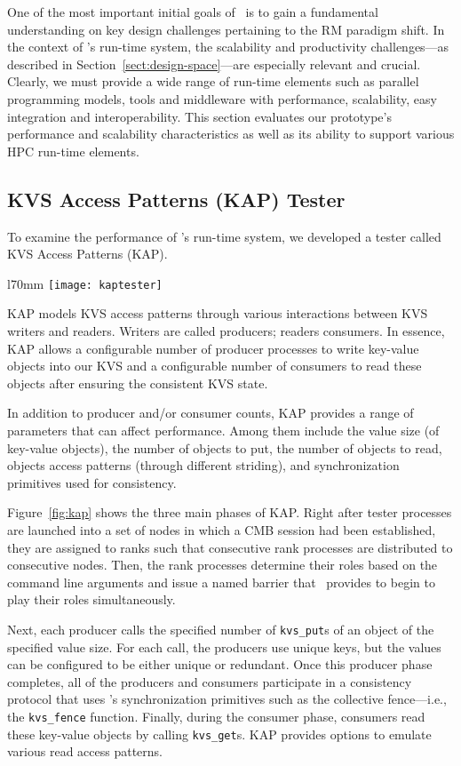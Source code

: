 One of the most important initial goals of \flux\ is to gain
a fundamental understanding on key design challenges pertaining
to the RM paradigm shift.
In the context of \flux's run-time system, the scalability
and productivity challenges---as described
in Section~\ref{sect:design-space}---are especially
relevant and crucial. Clearly, we  must provide a wide range
of run-time elements such as parallel programming models,
tools and middleware with performance, scalability, easy integration
and interoperability.
This section evaluates our prototype's performance
and scalability characteristics as well as its ability
to support various HPC run-time elements.


\subsection{KVS Access Patterns (KAP) Tester}
To examine the performance of \flux's run-time system,
we developed a tester called KVS Access Patterns (KAP).
\begin{wrapfigure}{l}{70mm}
  \vspace{-.5cm}
  \centering
  \texttt{[image: kaptester]}
  \caption{Main phases of KAP tester}
  \vspace{-.5cm}
  \label{fig:kap}
\end{wrapfigure}
KAP models KVS access patterns through various interactions
between KVS writers and readers. Writers are called producers;
readers consumers.
In essence, KAP allows a configurable number of producer processes
to write key-value objects into our KVS 
and a configurable number of consumers to read these
objects after ensuring the consistent KVS state.

In addition to producer and/or consumer counts,
KAP provides a range of parameters that can affect performance.
Among them include the value size (of key-value objects),
the number of objects to put,
the number of objects to read, objects access 
patterns (through different striding), and
synchronization primitives used for consistency.

Figure~\ref{fig:kap} shows the three main phases of KAP.
Right after tester processes are launched into a set of nodes
in which a CMB session had been established,
they are assigned to ranks such that consecutive rank
processes are distributed to consecutive nodes.
Then, the rank processes determine their roles based
on the command line arguments and issue a named barrier
that \flux\ provides to begin to play their roles
simultaneously.

Next, each producer calls the specified number of
{\tt kvs\_put}s of an object of the specified value size.
For each call, the producers use unique keys, but
the values can be configured to be either unique
or redundant.
Once this producer phase completes, all of the producers and consumers
participate in a consistency protocol that uses
\flux's synchronization primitives such as the collective
fence---i.e., the {\tt kvs\_fence} function.
Finally, during the consumer phase, consumers read
these key-value objects by calling {\tt kvs\_get}s.
KAP provides options to emulate various read access
patterns.

